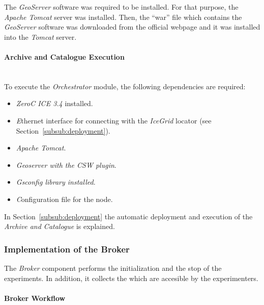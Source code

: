 The \emph{GeoServer} software was required to be installed. For that purpose, the
\emph{Apache Tomcat} server was installed. Then, the ``war''
file which contains the \emph{GeoServer} software was downloaded from the
official webpage and it was installed into the \emph{Tomcat} server.

\paragraph{Archive and Catalogue Execution}~\\

To execute the \emph{Orchestrator} module, the following dependencies
are required:
\begin{itemize}
\item \emph{ZeroC ICE 3.4} installed.
\item \emph Ethernet interface for connecting with the \emph{IceGrid} locator (see
  Section~\ref{subsub:deployment}).
\item \emph{Apache Tomcat}.
\item \emph{Geoserver with the \ac{CSW} plugin}.
\item \emph{Gsconfig library installed}.
\item \emph Configuration file for the node.
\end{itemize}
 In Section~\ref{subsub:deployment} the
  automatic deployment and execution of the \emph{Archive and Catalogue} is explained. 

\subsubsection{Implementation of the Broker}

The \emph{Broker} component performs the initialization and the stop of the
experiments. In addition, it collects the which are accesible by the experimenters.

\paragraph{Broker Workflow}~\\

